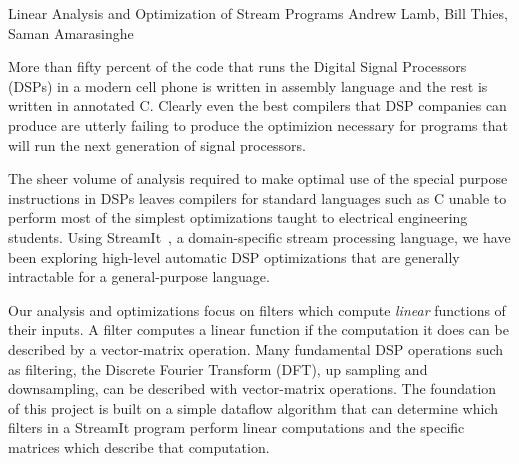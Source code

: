 

\formattitlecontents 
{Linear Analysis and Optimization of Stream Programs}
{Andrew Lamb, Bill Thies, Saman Amarasinghe}


%

More than fifty percent of the code that runs the Digital Signal Processors
(DSPs) in a modern cell phone is written in assembly language and the 
rest is written in annotated C\cite{gass-talk}. Clearly even the best 
compilers that DSP companies can produce are utterly failing to produce
the optimizion necessary for programs that will run the next generation
of signal processors.

The sheer volume of analysis required to make optimal use of the special 
purpose instructions in DSPs leaves compilers for standard languages such 
as C unable to perform most of the simplest optimizations taught to electrical 
engineering students. Using StreamIt~\cite{streamitcc}, 
a domain-specific stream processing language, we have been exploring
high-level automatic DSP optimizations that are generally intractable 
for a general-purpose language.

Our analysis and optimizations focus on filters which compute {\it linear} 
functions of their inputs. A filter computes a linear function if
the computation it does can be described by a vector-matrix operation. 
Many fundamental DSP operations such as filtering, the Discrete Fourier 
Transform (DFT), up sampling and downsampling, can be described 
with vector-matrix operations. The foundation of this project is built on
a simple dataflow algorithm that can determine which filters in a 
StreamIt program perform linear computations and the specific matrices
which describe that computation.

